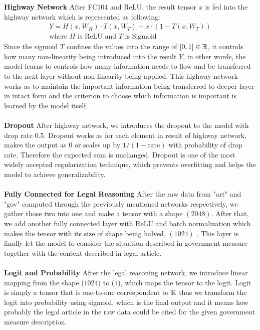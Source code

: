 \documentclass[sigconf]{acmart}
\begin{document}
\textbf{Highway Network} After FC104 and ReLU, the result tensor \(x\) is fed into the highway network \cite{DBLP:journals/corr/SrivastavaGS15} which is represented as following:
\begin{gather*}
    Y = H(x, W_H) \cdot T(x, W_T) + x \cdot (1-T(x, W_T)) \\
    \text{where } H \text{ is ReLU and }  T \text{ is Sigmoid} 
\end{gather*}
Since the sigmoid \(T\) confines the values into the range of \([0, 1] \in \Bbb{R}\), it controls how many non-linearity being introduced into the result \(Y\), in other words, the model learns to controls how many information needs to flow and be transferred to the next layer without non linearity being applied. This highway network works as to maintain the important information being transferred to deeper layer in intact form and the criterion to choose which information is important is learned by the model itself.\\\\
\textbf{Dropout} After highway network, we introduces the dropout \cite{JMLR:v15:srivastava14a} to the model with drop rate 0.5. Dropout works as for each element in result of highway network, makes the output as 0 or scales up by \(1 / (1-\text{rate})\) with probability of drop rate. Therefore the expected sum is unchanged.
Dropout is one of the most widely accepted regularization technique, which prevents overfitting and helps the model to achieve generalizability.\\\\
\textbf{Fully Connected for Legal Reasoning} After the raw data from "art" and "gov" computed through the previously mentioned networks respectively, we gather those two into one and make a tensor with a shape \((2048)\). After that, we add another fully connected layer with ReLU and batch normalization which makes the tensor with its size of shape being halved, \((1024)\) . This layer is finally let the model to consider the situation described in government measure together with the content described in legal article.\\\\
\textbf{Logit and Probability} After the legal reasoning network, we introduce linear mapping from the shape (\(1024\)) to (\(1\)), which maps the tensor to the logit. Logit is simply a tensor that is one-to-one correspondent to \(\Bbb{R}\) thus we transform the logit into probability using sigmoid, which is the final output and it means how probably the legal article in the raw data could be cited for the given government measure description.
\end{document}

